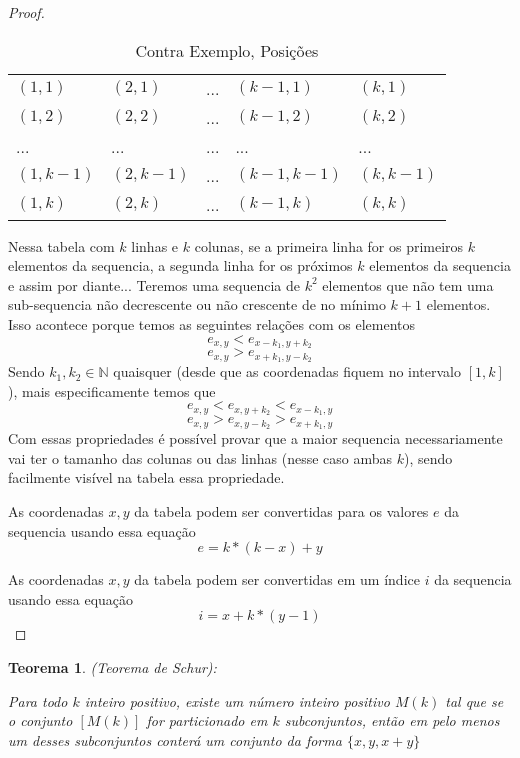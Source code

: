 \documentclass{article}
\newtheorem{teor}{Teorema}[section]
\begin{document}
\begin{proof}
    \begin{table}[h]
    \centering
    \caption{Contra Exemplo, Posições}
    \begin{tabular}{lllll}
    $(1,1)$ & $(2,1)$ & ... & $(k-1,1)$ & $(k,1)$ \\
    $(1,2)$ & $(2,2)$ & ... & $(k-1,2)$ & $(k,2)$ \\
    ... & ... & ... & ... & ... \\
    $(1,k-1)$ & $(2,k-1)$ & ... & $(k-1,k-1)$ & $(k,k-1)$ \\
    $(1,k)$ & $(2,k)$ & ... & $(k-1,k)$ & $(k,k)$ \\
    \end{tabular}
    \end{table}

    Nessa tabela com $k$ linhas e $k$ colunas, se a primeira linha for os primeiros $k$ elementos da sequencia, a segunda linha for os próximos $k$ elementos da sequencia e assim por diante... Teremos uma sequencia de $k^2$ elementos que não tem uma sub-sequencia não decrescente ou não crescente de no mínimo $k+1$ elementos. Isso acontece porque temos as seguintes relações com os elementos
    \[e_{x,y} < e_{x-k_1,y+k_2}\]
    \[e_{x,y} > e_{x+k_1,y-k_2}\]
    Sendo $k_1,k_2 \in \mathbb{N}$ quaisquer (desde que as coordenadas fiquem no intervalo $[1,k]$), mais especificamente temos que
    \[e_{x,y} < e_{x,y+k_2} < e_{x-k_1,y}\]
    \[e_{x,y} > e_{x,y-k_2} > e_{x+k_1,y}\]
    Com essas propriedades é possível provar que a maior sequencia necessariamente vai ter o tamanho das colunas ou das linhas (nesse caso ambas $k$), sendo facilmente visível na tabela essa propriedade.

    As coordenadas $x,y$ da tabela podem ser convertidas para os valores $e$ da sequencia usando essa equação
    \[e=k*(k-x)+y\]

    As coordenadas $x,y$ da tabela podem ser convertidas em um índice $i$ da sequencia usando essa equação
    \[i=x+k*(y-1)\]
\end{proof}


\begin{teor}
    (Teorema de Schur):

    Para todo $k$ inteiro positivo, existe um número inteiro positivo $M(k)$ tal que se o conjunto $[M(k)]$ for particionado em $k$ subconjuntos, então em pelo menos um desses subconjuntos conterá um conjunto da forma $\{x, y, x+y\}$
\end{teor}
\end{document}
